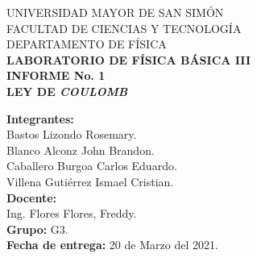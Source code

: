 \documentclass[letter,11pt]{article}
\begin{document}
\begin{titlepage}
\begin{center}
{\Large UNIVERSIDAD MAYOR DE SAN SIMÓN}\\
\vspace*{0.15cm}
{\large FACULTAD DE CIENCIAS Y TECNOLOGÍA}\\
\vspace*{0.10cm}
DEPARTAMENTO DE FÍSICA\\
\vspace*{3.0cm}
{\Large \textbf{LABORATORIO DE FÍSICA BÁSICA III}}\\
\vspace*{0.3cm}
{\Large \textbf{INFORME No. 1}}\\
\vspace*{3.5cm}
{\Large \textbf{LEY DE \emph{COULOMB}}}\\
\end{center}

\vspace*{6.2cm}
\leftskip=7.95cm
\noindent
\textbf{Integrantes:}\\
Bastos Lizondo Rosemary.\\
Blanco Alconz John Brandon.\\
Caballero Burgoa Carlos Eduardo.\\
Villena Gutiérrez Ismael Cristian.\\
\newline
\textbf{Docente:}\\
Ing. Flores Flores, Freddy.\\
\newline
\textbf{Grupo:} G3.\\
\textbf{Fecha de entrega:} 20 de Marzo del 2021.\\

\end{titlepage}
\end{document}
